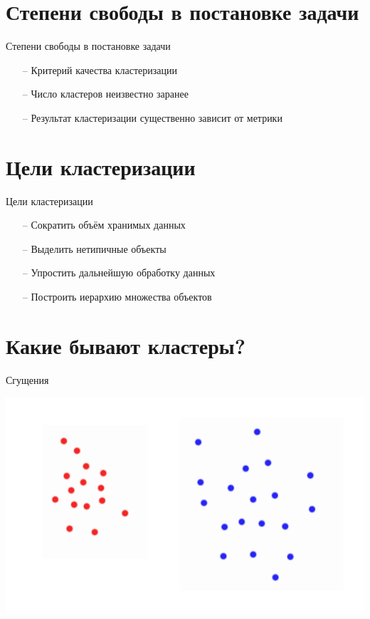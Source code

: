 \documentclass[10pt]{beamer}
\begin{document}
\section{Степени свободы в постановке задачи}

\begin{frame}{Степени свободы в постановке задачи}
	\begin{itemize} [<+- | alert@+>]
		\item[--] Критерий качества кластеризации
		\item[--] Число кластеров неизвестно заранее
		\item[--] Результат кластеризации существенно зависит от метрики
	\end{itemize}
\end{frame}

\section{Цели кластеризации}

\begin{frame}{Цели кластеризации}
	\begin{itemize} [<+- | alert@+>]
		\item[--] Сократить объём хранимых данных
		\item[--] Выделить нетипичные объекты
		\item[--] Упростить дальнейшую обработку данных
		\item[--] Построить иерархию множества объектов				
	\end{itemize}
\end{frame}

\section{Какие бывают кластеры?}

\begin{frame}{Сгущения}
	\begin{center}
    \includegraphics[height=0.8 \textheight, keepaspectratio = true]{images/cluster1}  
	\end{center}
\end{frame}
\end{document}
